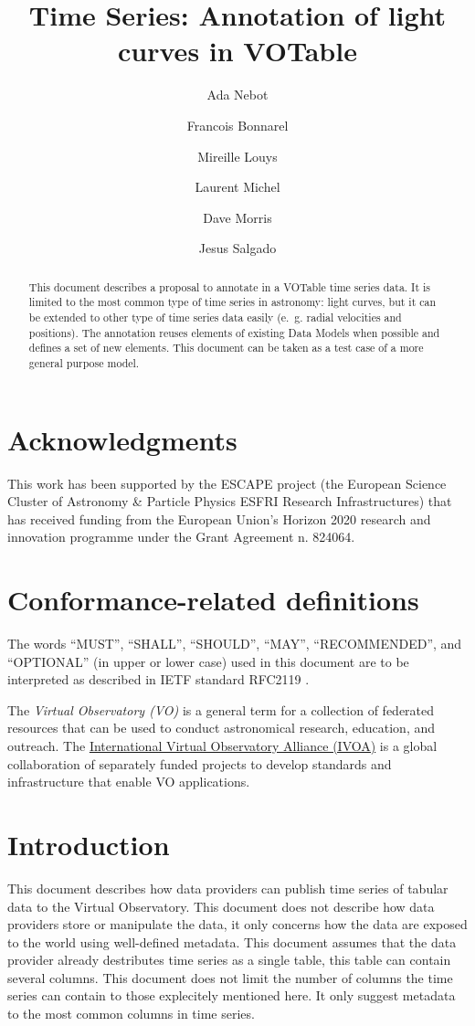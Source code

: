 \documentclass[11pt,a4paper]{ivoa}
\title{Time Series: Annotation of light curves in VOTable}
\author[http://www.ivoa.net/twiki/bin/view/IVOA/AdaNebot]{Ada Nebot}
\author[http://www.ivoa.net/twiki/bin/view/IVOA/FrancoisBonnarel]{Francois Bonnarel}
\author[http://www.ivoa.net/twiki/bin/view/IVOA/MireilleLouys]{Mireille Louys}
\author[http://www.ivoa.net/twiki/bin/view/IVOA/LaurentMichel]{Laurent Michel}
\author[http://www.ivoa.net/twiki/bin/view/IVOA/DaveMorris]{Dave Morris}
\author[http://www.ivoa.net/twiki/bin/view/IVOA/JesusSalgado]{Jesus Salgado}
\begin{document}
\begin{abstract}
  This document describes a proposal to annotate in a VOTable time series data. It is limited to the most common type of time series in astronomy: light curves, but it can be extended to other type of time series data easily (e.~g. radial velocities and positions). The annotation reuses elements of existing Data Models when possible and defines a set of new elements. This document can be taken as a test case of a more general purpose model. 
\end{abstract}

\section*{Acknowledgments}
This work has been supported by the ESCAPE project (the European Science Cluster of Astronomy \& Particle Physics ESFRI Research Infrastructures) that has received funding from the European Union’s Horizon 2020 research and innovation programme under the Grant Agreement n. 824064.

\section*{Conformance-related definitions}

The words ``MUST'', ``SHALL'', ``SHOULD'', ``MAY'', ``RECOMMENDED'', and
``OPTIONAL'' (in upper or lower case) used in this document are to be
interpreted as described in IETF standard RFC2119 \citet{std:RFC2119}.

The \emph{Virtual Observatory (VO)} is a
general term for a collection of federated resources that can be used
to conduct astronomical research, education, and outreach.
The \href{http://www.ivoa.net}{International
Virtual Observatory Alliance (IVOA)} is a global
collaboration of separately funded projects to develop standards and
infrastructure that enable VO applications.


\section{Introduction}
This document describes how data providers can publish time series of tabular data to the Virtual Observatory. This document does not describe how data providers store or manipulate the data, it only concerns how the data are exposed to the world using well-defined metadata. This document assumes that the data provider already destributes time series as a single table, this table can contain several columns. This document does not limit the number of columns the time series can contain to those explecitely mentioned here. It only suggest metadata to the most common columns in time series.  
\end{document}
